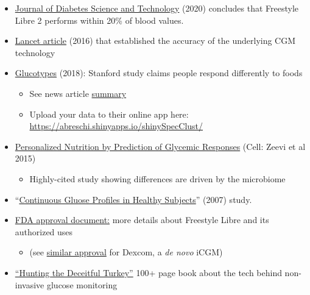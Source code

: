 \documentclass[
]{book}
\providecommand{\tightlist}{%
  \setlength{\itemsep}{0pt}\setlength{\parskip}{0pt}}
\begin{document}
\begin{itemize}
\tightlist
\item
  \href{https://journals.sagepub.com/doi/full/10.1177/1932296820958754}{Journal of Diabetes Science and Technology} (2020) concludes that Freestyle Libre 2 performs within 20\% of blood values.
\item
  \href{https://doi.org/10.1016/S0140-6736(16)31535-5}{Lancet article} (2016) that established the accuracy of the underlying CGM technology
\item
  \href{https://journals.plos.org/plosbiology/article/file?id=10.1371/journal.pbio.2005143\&type=printable}{Glucotypes} (2018): Stanford study claims people respond differently to foods

  \begin{itemize}
  \tightlist
  \item
    See news article \href{https://med.stanford.edu/news/all-news/2018/07/diabetic-level-glucose-spikes-seen-in-healthy-people.html}{summary}
  \item
    Upload your data to their online app here: \url{https://abreschi.shinyapps.io/shinySpecClust/}
  \end{itemize}
\item
  \href{https://www.cell.com/cell/fulltext/S0092-8674(15)01481-6?_returnURL=https\%3A\%2F\%2Flinkinghub.elsevier.com\%2Fretrieve\%2Fpii\%2FS0092867415014816\%3Fshowall\%3Dtrue}{Personalized Nutrition by Prediction of Glycemic Responses} (Cell: Zeevi et al 2015)

  \begin{itemize}
  \tightlist
  \item
    Highly-cited study showing differences are driven by the microbiome
  \end{itemize}
\item
  ``\href{https://www.ncbi.nlm.nih.gov/pmc/articles/PMC2769652/}{Continuous Gluose Profiles in Healthy Subjects}'' (2007) study.
\item
  \href{https://www.accessdata.fda.gov/cdrh_docs/pdf16/P160030S017a.pdf}{FDA approval document:} more details about Freestyle Libre and its authorized uses

  \begin{itemize}
  \tightlist
  \item
    (see \href{https://www.accessdata.fda.gov/cdrh_docs/pdf17/DEN170088.pdf}{similar approval} for Dexcom, a \emph{de novo} iCGM)
  \end{itemize}
\item
  \href{http://www.mendosa.com/The\%20Pursuit\%20of\%20Noninvsive\%20Glucose,\%20Fourth\%20Edition.pdf}{``Hunting the Deceitful Turkey''} 100+ page book about the tech behind non-invasive glucose monitoring
\end{itemize}
\end{document}
